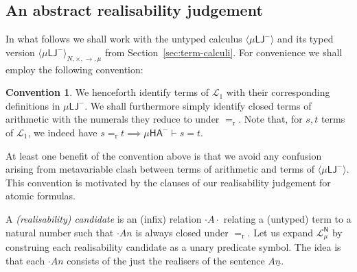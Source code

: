 \documentclass[10pt,a4paper]{amsart}
\theoremstyle{plain}
\theoremstyle{definition}
\newtheorem{convention}[convention]{Convention}
\theoremstyle{plain}
\theoremstyle{definition} %
\newcommand{\numeral}[1]{\underline{#1}}
\newcommand{\closure}[1]{\langle #1 \rangle}
\newcommand{\clomuLJneg}{\closure{\muLJneg}}
\newcommand{\typedclomuLJneg}{\clomuLJneg_{\N,\times,\arrow,\mu}}
\newcommand{\nat}{\mathit{N}}
\newcommand{\N}{\nat} %
\newcommand{\arrow}{\to}
\newcommand{\LJ}{\mathsf{LJ}}
\newcommand{\muLJ}{\mu\LJ}
\newcommand{\muLJneg}{\muLJ^-}
\newcommand{\reduction}{\mathrm{r}}
\newcommand{\converts}{=_{\reduction}}
\newcommand{\Lang}{\mathcal L}
\newcommand{\lang}[1]{\Lang_{#1}}
\newcommand{\langarith}{\lang 1}
\newcommand{\langmuarith}{\lang \mu}
\newcommand{\proves}{\vdash}
\newcommand{\HA}{\mathsf{HA}}
\newcommand{\muHA}{\mu\HA}
\newcommand{\pNat}{\mathsf{N}}
\newcommand{\muHAneg}{\muHA^-}
\begin{document}
\subsection{An abstract realisability judgement}
In what follows we shall work with the untyped calculus $\clomuLJneg$ and its typed version $\typedclomuLJneg$ from Section~\ref{sec:term-calculi}.
For convenience we shall employ the following convention:
\begin{convention}
We henceforth identify terms of $\langarith$ with their corresponding definitions in $\muLJneg$. 
We shall furthermore simply identify closed terms of arithmetic with the numerals they reduce to under $\converts$.
Note that, for $s,t$ terms of $\langarith$, we indeed have $s\converts t \implies \muHAneg \proves s=t$.
\end{convention}
At least one benefit of the convention above
is that we avoid any confusion arising from metavariable clash between terms of arithmetic and terms of $\clomuLJneg$. 
This convention is motivated by the clauses of our realisability judgement for atomic formulas.


\medskip



A \emph{(realisability) candidate} is an (infix) relation $\cdot A \cdot $ relating a (untyped) term to a natural number such that $\cdot A n$ is always closed under $\converts$. 
Let us expand $\langmuarith^\pNat $ by construing each realisability candidate as a unary predicate symbol.
The idea is that each $\cdot An $ consists of the just the realisers of the sentence $A\numeral n$.
\end{document}
